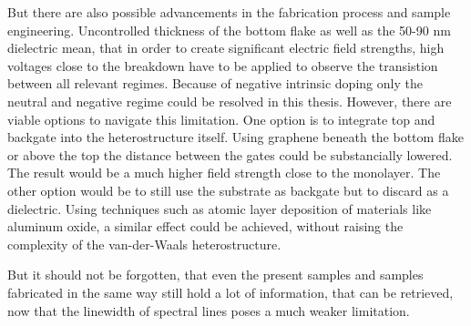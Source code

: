 But there are also possible advancements in the fabrication process and sample engineering. Uncontrolled thickness of the bottom \hbng flake as well as the 50-90 nm \sio dielectric mean, that in order to create significant electric field strengths, high voltages close to the breakdown have to be applied to observe the transistion between all relevant regimes. Because of negative intrinsic doping only the neutral and negative regime could be resolved in this thesis. However, there are viable options to navigate this limitation. One option is to integrate top and backgate into the heterostructure itself. Using graphene beneath the bottom \hbng flake or above the top the distance between the gates could be substancially lowered. The result would be a much higher field strength close to the monolayer. The other option would be to still use the substrate as backgate but to discard \sio as a dielectric. Using techniques such as atomic layer deposition of materials like aluminum oxide, a similar effect could be achieved, without raising the complexity of the van-der-Waals heterostructure.

But it should not be forgotten, that even the present samples and samples fabricated in the same way still hold a lot of information, that can be retrieved, now that the linewidth of spectral lines poses a much weaker limitation. 
